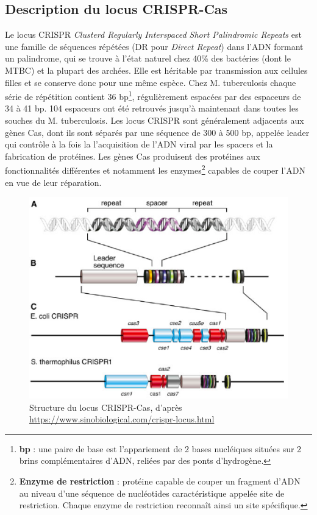 \documentclass[twoside,a4paper,11pt,frenchb,openany]{report}
\begin{document}

\subsection{Description du locus CRISPR-Cas}

Le locus CRISPR \textit{Clusterd Regularly Interspaced Short Palindromic Repeats} est une famille de séquences répétées (DR pour \textit{Direct Repeat}) dans l'ADN formant un palindrome, qui se trouve à l'état naturel chez 40\% des bactéries (dont le MTBC) et la plupart des archées. Elle est héritable par transmission aux cellules filles et se conserve donc pour une même espèce. Chez M. tuberculosis chaque série de répétition contient 36 bp\footnote{\textbf{bp} : une paire de base est l'appariement de 2 bases nucléiques situées sur 2 brins complémentaires d'ADN, reliées par des ponts d'hydrogène.}, régulièrement espacées par des espaceurs de 34 à 41 bp. 104 espaceurs ont été retrouvés jusqu'à maintenant dans toutes les souches du M. tuberculosis. Les locus CRISPR sont généralement adjacents aux gènes Cas, dont ils sont séparés par une séquence de 300 à 500 bp, appelée leader qui contrôle à la fois la l'acquisition de l'ADN viral par les spacers et la fabrication de protéines. Les gènes Cas produisent des protéines aux fonctionnalités différentes et notamment les enzymes\footnote{\textbf{Enzyme de restriction} : protéine capable de couper un fragment d'ADN au niveau d'une séquence de nucléotides caractéristique appelée site de restriction. Chaque enzyme de restriction reconnaît ainsi un site spécifique.} capables de couper l'ADN en vue de leur réparation.

\begin{figure}[h!]
\centering
\includegraphics[scale=0.6]{crispr.png}
\caption{Structure du locus CRISPR-Cas, d'après\\ \url{https://www.sinobiological.com/crispr-locus.html}}
\end{figure}
\end{document}
